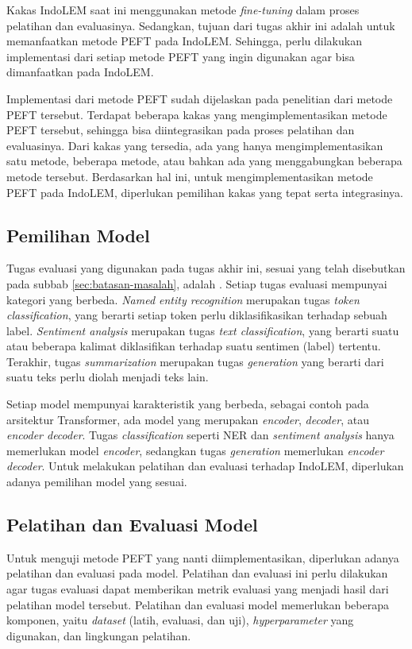 Kakas IndoLEM saat ini menggunakan metode \textit{fine-tuning} dalam proses pelatihan dan evaluasinya. Sedangkan, tujuan dari tugas akhir ini adalah untuk memanfaatkan metode PEFT pada IndoLEM. Sehingga, perlu dilakukan implementasi dari setiap metode PEFT yang ingin digunakan agar bisa dimanfaatkan pada IndoLEM.

Implementasi dari metode PEFT sudah dijelaskan pada penelitian dari metode PEFT tersebut. Terdapat beberapa kakas yang mengimplementasikan metode PEFT tersebut, sehingga bisa diintegrasikan pada proses pelatihan dan evaluasinya. Dari kakas yang tersedia, ada yang hanya mengimplementasikan satu metode, beberapa metode, atau bahkan ada yang menggabungkan beberapa metode tersebut. Berdasarkan hal ini, untuk mengimplementasikan metode PEFT pada IndoLEM, diperlukan pemilihan kakas yang tepat serta integrasinya.

\subsection{Pemilihan Model}

Tugas evaluasi yang digunakan pada tugas akhir ini, sesuai yang telah disebutkan pada subbab \ref{sec:batasan-masalah}, adalah \nlptask. Setiap tugas evaluasi mempunyai kategori yang berbeda. \textit{Named entity recognition} merupakan tugas \textit{token classification}, yang berarti setiap token perlu diklasifikasikan terhadap sebuah label. \textit{Sentiment analysis} merupakan tugas \textit{text classification},  yang berarti suatu atau beberapa kalimat diklasifikan terhadap suatu sentimen (label) tertentu. Terakhir, tugas \textit{summarization} merupakan tugas \textit{generation} yang berarti dari suatu teks perlu diolah menjadi teks lain.

Setiap model mempunyai karakteristik yang berbeda, sebagai contoh pada arsitektur Transformer, ada model yang merupakan \textit{encoder}, \textit{decoder}, atau \textit{encoder decoder}. Tugas \textit{classification} seperti NER dan \textit{sentiment analysis} hanya memerlukan model \textit{encoder}, sedangkan tugas \textit{generation} memerlukan \textit{encoder decoder}. Untuk melakukan pelatihan dan evaluasi terhadap IndoLEM, diperlukan adanya pemilihan model yang sesuai.

\subsection{Pelatihan dan Evaluasi Model}

Untuk menguji metode PEFT yang nanti  diimplementasikan, diperlukan adanya pelatihan dan evaluasi pada model. Pelatihan dan evaluasi ini perlu dilakukan agar tugas evaluasi dapat memberikan metrik evaluasi yang menjadi hasil dari pelatihan model tersebut. Pelatihan dan evaluasi model memerlukan beberapa komponen, yaitu \textit{dataset} (latih, evaluasi, dan uji), \textit{hyperparameter} yang digunakan, dan lingkungan pelatihan.

